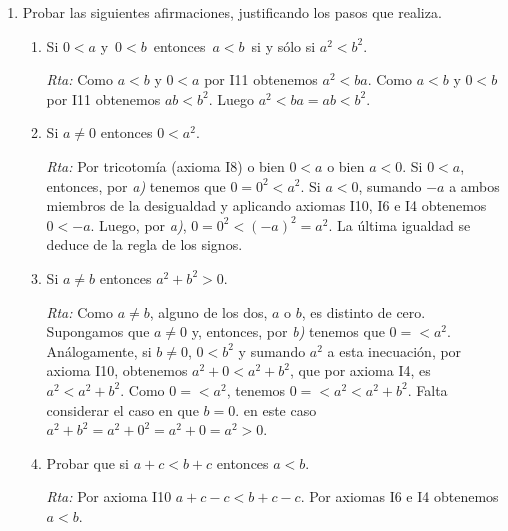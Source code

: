 \documentclass[a4paper,12pt,twoside,spanish,reqno]{amsbook}
\numberwithin{equation}{section}
\newcommand{\rta}{\noindent\textit{Rta: }}
\begin{document}
\begin{enumerate}
\begin{enumerate}
            \rta Como $0<a\,$ y $\,0<b\,$, por axioma I11, $0 \cdot b < a \cdot b$. Por un resultado del teórico  tenemos que $0 \cdot b = 0$, luego $0 < a\cdot b$.
            
            \item $a<b\,$ y $\,c<0$ implican $\,b\cdot c<a\cdot c$
            
            \rta Sumamos $-c$  a la inecuación  $\,c<0$ y  obtenemos, por axioma I10,    $-c + c<-c + 0$, luego por axioma I6 en la parte izquierda y axioma I4 en la parte derecha, obtenemos $0 < -c$: Ahora bien  por axioma I11, $a<b\,$ y  $0 < -c$ implican $a \cdot (-c)<b \cdot (-c)$. Por la regla de los signos tenemos $-a \cdot c<- b \cdot c$. Sumando $a \cdot c$ y $ b \cdot c$  a ambos lados de la inecuación y aplicando axioma I10 y  repetidamente los axiomas I4 e I6, obtenemos  $\,b\cdot c<a\cdot c$.
        \end{enumerate}
        
        \item  Probar las siguientes afirmaciones, justificando los pasos que realiza.
        \begin{enumerate}
            \item Si $0 < a$  y $\,0<b\,$ entonces $\,a<b\,$ si y sólo si $a^2<b^2$.
            
            \rta  Como $a < b$ y $0 < a$ por I11 obtenemos $a^2 < ba$. Como $a < b$ y $0 < b$ por I11 obtenemos $ab < b^2$. Luego  $a^2 < ba = ab < b^2$.
            
            
            \item Si $a\neq 0$  entonces $0 < a^2$.
            
            \rta  Por tricotomía (axioma I8) o bien $0 <a$ o bien $a <0$. Si $0<a$, entonces, por \textit{a)} tenemos que $0 = 0^2 < a^2$.  Si $a<0$, sumando $-a$ a ambos miembros de la desigualdad y aplicando axiomas I10, I6 e I4 obtenemos $0 < -a$. Luego, por \textit{a)},  $0 = 0^2 < (-a)^2 = a^2$. La última igualdad se deduce de la regla de los signos. 
            
            \item Si $a\neq b$  entonces $a^2+b^2>0$.
            
            \rta Como $a\neq b$,  alguno de los dos, $a$ o $b$, es distinto de cero. Supongamos que $a \ne 0$ y, entonces, por  \textit{b)} tenemos que $0 = < a^2$. Análogamente, si $b \ne 0$, $0 < b^2$ y sumando  $a^2$  a esta inecuación, por axioma I10, obtenemos $a^2 + 0 <a^2 + b^2$, que por axioma I4, es $a^2  <a^2 + b^2$. Como $0 = < a^2$, tenemos $0 = < a^2 < a^2 + b^2$. Falta considerar el caso en que  $b =0$. en este caso $a^2 + b^2 = a^2 + 0^2 = a^2 + 0 = a^2 > 0$.
            
            
            
            
            \item Probar que si $a+c <b+c$ entonces $a<b$.
            
            \rta Por  axioma I10 $a+c -c  <b+c -c$. Por axiomas I6 e I4 obtenemos $a<b$.
        \end{enumerate}
    \end{enumerate}
        
    


    
\end{document}
